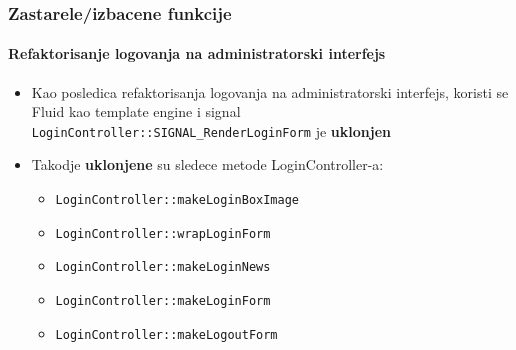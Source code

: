 \begin{frame}[fragile]
	\frametitle{Zastarele/izbacene funkcije}
	\framesubtitle{Refaktorisanje logovanja na administratorski interfejs}

	\begin{itemize}

		\item Kao posledica refaktorisanja logovanja na administratorski interfejs, koristi se Fluid kao template engine i signal
			\small\texttt{LoginController::SIGNAL\_RenderLoginForm}\normalsize\space
			je \textbf{uklonjen}

		\item Takodje \textbf{uklonjene} su sledece metode LoginController-a:

			\begin{itemize}
				\item \texttt{LoginController::makeLoginBoxImage}
				\item \texttt{LoginController::wrapLoginForm}
				\item \texttt{LoginController::makeLoginNews}
				\item \texttt{LoginController::makeLoginForm}
				\item \texttt{LoginController::makeLogoutForm}
			\end{itemize}

	\end{itemize}

\end{frame}


